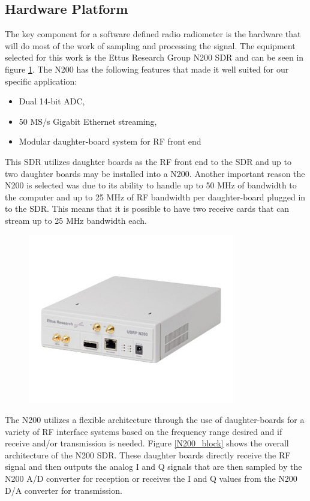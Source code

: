 \subsection{Hardware Platform}
The key component for a software defined radio radiometer is the hardware that will do most of the work of sampling and processing the signal.  The equipment selected for this work is the Ettus Research Group N200 SDR and can be seen in figure \ref{N200}.  The N200 has the following features that made it well suited for our specific application:

\begin{itemize}
\item Dual 14-bit ADC,
\item 50 MS/s Gigabit Ethernet streaming,
\item Modular daughter-board system for RF front end
\end{itemize}

This SDR utilizes daughter boards as the RF front end to the SDR and up to two daughter boards may be installed into a N200.  Another important reason the N200 is selected was due to its ability to handle up to 50 MHz of bandwidth to the computer and up to 25 MHz of RF bandwidth per daughter-board plugged in to the SDR.  This means that it is possible to have two receive cards that can stream up to 25 MHz bandwidth each.

{\begin{figure}[h!tb] 
\centering
\includegraphics{Images/n200}
\label{N200}
\end{figure}
}

The N200 utilizes a flexible architecture through the use of daughter-boards for a variety of RF interface systems based on the frequency range desired and if receive and/or transmission is needed.  Figure \ref{N200_block} shows the overall architecture of the N200 SDR.  These daughter boards directly receive the RF signal and then outputs the analog I and Q signals that are then sampled by the N200 A/D converter for reception or receives the I and Q values from the N200 D/A converter for transmission. 

